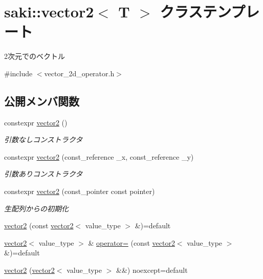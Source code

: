 \hypertarget{classsaki_1_1vector2}{}\section{saki\+:\+:vector2$<$ T $>$ クラステンプレート}
\label{classsaki_1_1vector2}


2次元でのベクトル  




{\ttfamily \#include $<$vector\+\_\+2d\+\_\+operator.\+h$>$}

\subsection*{公開メンバ関数}
\begin{DoxyCompactItemize}
\item 
constexpr \mbox{\hyperlink{classsaki_1_1vector2_a30a12a2e1e15cf3a41d33e7f3829aade}{vector2}} ()
\begin{DoxyCompactList}\small\item\em 引数なしコンストラクタ \end{DoxyCompactList}\item 
constexpr \mbox{\hyperlink{classsaki_1_1vector2_a28a39f7c69d7fd6393d498065cc51c00}{vector2}} (const\+\_\+reference \+\_\+x, const\+\_\+reference \+\_\+y)
\begin{DoxyCompactList}\small\item\em 引数ありコンストラクタ \end{DoxyCompactList}\item 
constexpr \mbox{\hyperlink{classsaki_1_1vector2_a1617f6938d6e36c7c5d6921719b19b14}{vector2}} (const\+\_\+pointer const pointer)
\begin{DoxyCompactList}\small\item\em 生配列からの初期化 \end{DoxyCompactList}\item 
\mbox{\hyperlink{classsaki_1_1vector2_a10bf1b89f32e86f02e065d099d2a393c}{vector2}} (const \mbox{\hyperlink{classsaki_1_1vector2}{vector2}}$<$ value\+\_\+type $>$ \&)=default
\item 
\mbox{\hyperlink{classsaki_1_1vector2}{vector2}}$<$ value\+\_\+type $>$ \& \mbox{\hyperlink{classsaki_1_1vector2_a1eb44aa9d36eb7cae665d4c8544f5205}{operator=}} (const \mbox{\hyperlink{classsaki_1_1vector2}{vector2}}$<$ value\+\_\+type $>$ \&)=default
\item 
\mbox{\hyperlink{classsaki_1_1vector2_af19b2ba1f8433ef4feeff2cabae128d2}{vector2}} (\mbox{\hyperlink{classsaki_1_1vector2}{vector2}}$<$ value\+\_\+type $>$ \&\&) noexcept=default

\end{DoxyCompactItemize}
